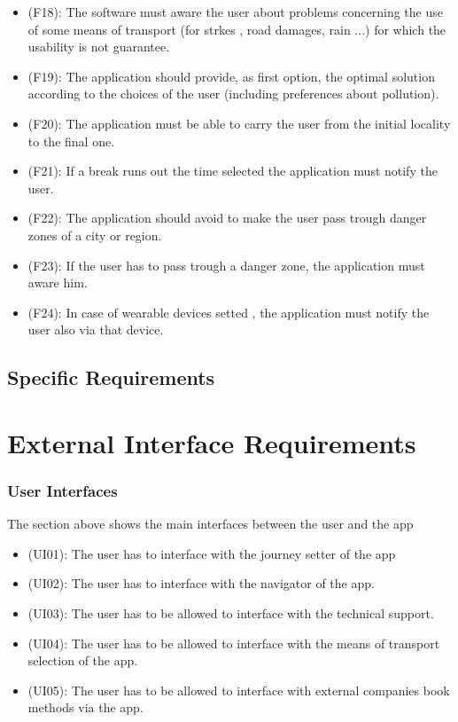 \documentclass[a4paper]{book}
\begin{document}
\begin{itemize}
\item (F18): The software must aware the user about problems concerning the use of some means of transport (for strkes , road damages, rain ...) for which the usability is not guarantee.
\item (F19): The application should provide, as first option, the optimal solution according to the choices of the user (including preferences about pollution).
\item (F20): The application must be able to carry the user from the initial locality to the final one.
\item (F21): If a break runs out the time selected the application must notify the user.
\item (F22): The application should avoid to make the user pass trough danger zones of a city or region.
\item (F23): If the user has to pass trough a danger zone, the application must aware him.
\item (F24): In case of wearable devices setted , the application must notify the user also via that device.

\end{itemize}

\chapter{Specific Requirements}

\part{External Interface Requirements}

\section{User Interfaces}
The section above shows the main interfaces between the user and the app 
\begin{itemize}
\item (UI01): The user has to interface with the journey setter of the app
\item (UI02): The user has to interface with the navigator of the app.
\item (UI03): The user has to be allowed to interface with the technical support.
\item (UI04): The user has to be allowed to interface with the means of transport selection of the app.
\item (UI05): The user has to be allowed to interface with external companies book methods via the app.
\end{itemize}
\end{document}
